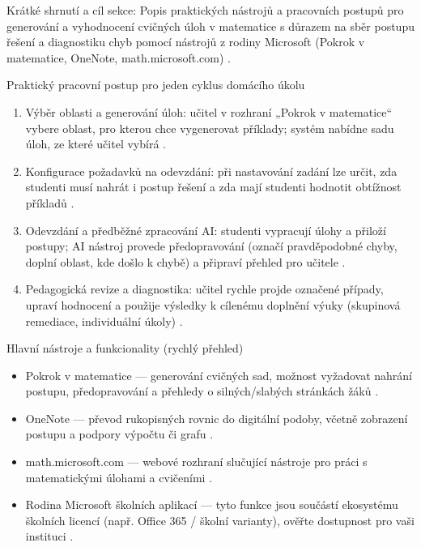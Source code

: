 Krátké shrnutí a cíl sekce: Popis praktických nástrojů a pracovních postupů pro generování a vyhodnocení cvičných úloh v matematice s důrazem na sběr postupu řešení a diagnostiku chyb pomocí nástrojů z rodiny Microsoft (Pokrok v matematice, OneNote, math.microsoft.com) \cite{kb_ai_101_tipu_pdf_04e4a115_page_8_1}.

Praktický pracovní postup pro jeden cyklus domácího úkolu
\begin{enumerate}
  \item Výběr oblasti a generování úloh: učitel v rozhraní „Pokrok v matematice“ vybere oblast, pro kterou chce vygenerovat příklady; systém nabídne sadu úloh, ze které učitel vybírá \cite{kb_ai_101_tipu_pdf_04e4a115_page_8_1}.
  \item Konfigurace požadavků na odevzdání: při nastavování zadání lze určit, zda studenti musí nahrát i postup řešení a zda mají studenti hodnotit obtížnost příkladů \cite{kb_ai_101_tipu_pdf_04e4a115_page_8_1}.
  \item Odevzdání a předběžné zpracování AI: studenti vypracují úlohy a přiloží postupy; AI nástroj provede předopravování (označí pravděpodobné chyby, doplní oblast, kde došlo k chybě) a připraví přehled pro učitele \cite{kb_ai_101_tipu_pdf_04e4a115_page_8_1}.
  \item Pedagogická revize a diagnostika: učitel rychle projde označené případy, upraví hodnocení a použije výsledky k cílenému doplnění výuky (skupinová remediace, individuální úkoly) \cite{kb_ai_101_tipu_pdf_04e4a115_page_8_1}.
\end{enumerate}

Hlavní nástroje a funkcionality (rychlý přehled)
\begin{itemize}
  \item Pokrok v matematice — generování cvičných sad, možnost vyžadovat nahrání postupu, předopravování a přehledy o silných/slabých stránkách žáků \cite{kb_ai_101_tipu_pdf_04e4a115_page_8_1}.
  \item OneNote — převod rukopisných rovnic do digitální podoby, včetně zobrazení postupu a podpory výpočtu či grafu \cite{kb_ai_101_tipu_pdf_04e4a115_page_8_1}.
  \item math.microsoft.com — webové rozhraní slučující nástroje pro práci s matematickými úlohami a cvičeními \cite{kb_ai_101_tipu_pdf_04e4a115_page_8_1}.
  \item Rodina Microsoft školních aplikací — tyto funkce jsou součástí ekosystému školních licencí (např. Office 365 / školní varianty), ověřte dostupnost pro vaši instituci \cite{kb_ai_101_tipu_pdf_04e4a115_page_3_1}.
\end{itemize}

